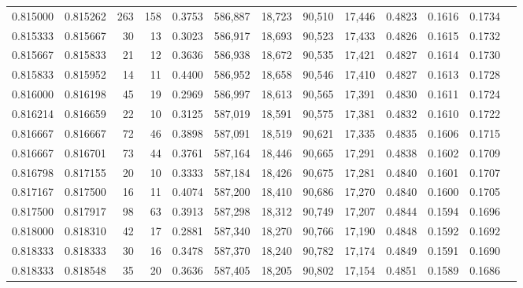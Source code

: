 \begin{tabular}{rrrrrrrrrrrrr}
0.815000 & 0.815262 &   263 & 158 &                                     0.3753 & 586,887 &  18,723 &  90,510 &  17,446 & 0.4823 & 0.1616 & 0.1734 \\
0.815333 & 0.815667 &    30 &  13 &                                     0.3023 & 586,917 &  18,693 &  90,523 &  17,433 & 0.4826 & 0.1615 & 0.1732 \\
0.815667 & 0.815833 &    21 &  12 &                                     0.3636 & 586,938 &  18,672 &  90,535 &  17,421 & 0.4827 & 0.1614 & 0.1730 \\
0.815833 & 0.815952 &    14 &  11 &                                     0.4400 & 586,952 &  18,658 &  90,546 &  17,410 & 0.4827 & 0.1613 & 0.1728 \\
0.816000 & 0.816198 &    45 &  19 &                                     0.2969 & 586,997 &  18,613 &  90,565 &  17,391 & 0.4830 & 0.1611 & 0.1724 \\
0.816214 & 0.816659 &    22 &  10 &                                     0.3125 & 587,019 &  18,591 &  90,575 &  17,381 & 0.4832 & 0.1610 & 0.1722 \\
0.816667 & 0.816667 &    72 &  46 &                                     0.3898 & 587,091 &  18,519 &  90,621 &  17,335 & 0.4835 & 0.1606 & 0.1715 \\
0.816667 & 0.816701 &    73 &  44 &                                     0.3761 & 587,164 &  18,446 &  90,665 &  17,291 & 0.4838 & 0.1602 & 0.1709 \\
0.816798 & 0.817155 &    20 &  10 &                                     0.3333 & 587,184 &  18,426 &  90,675 &  17,281 & 0.4840 & 0.1601 & 0.1707 \\
0.817167 & 0.817500 &    16 &  11 &                                     0.4074 & 587,200 &  18,410 &  90,686 &  17,270 & 0.4840 & 0.1600 & 0.1705 \\
0.817500 & 0.817917 &    98 &  63 &                                     0.3913 & 587,298 &  18,312 &  90,749 &  17,207 & 0.4844 & 0.1594 & 0.1696 \\
0.818000 & 0.818310 &    42 &  17 &                                     0.2881 & 587,340 &  18,270 &  90,766 &  17,190 & 0.4848 & 0.1592 & 0.1692 \\
0.818333 & 0.818333 &    30 &  16 &                                     0.3478 & 587,370 &  18,240 &  90,782 &  17,174 & 0.4849 & 0.1591 & 0.1690 \\
0.818333 & 0.818548 &    35 &  20 &                                     0.3636 & 587,405 &  18,205 &  90,802 &  17,154 & 0.4851 & 0.1589 & 0.1686 \\

\end{tabular}
